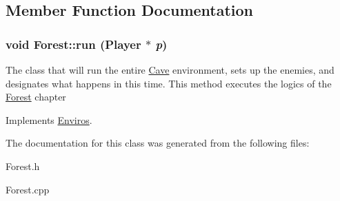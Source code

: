 \subsection{Member Function Documentation}
\hypertarget{classForest_a22996cfd5e18402e640316b7a6fb5feb}{
\subsubsection[{run}]{\setlength{\rightskip}{0pt plus 5cm}void Forest::run ({\bf Player} $\ast$ {\em p})}}
\label{classForest_a22996cfd5e18402e640316b7a6fb5feb}


The class that will run the entire \hyperlink{classCave}{Cave} environment, sets up the enemies, and designates what happens in this time. This method executes the logics of the \hyperlink{classForest}{Forest} chapter 

Implements \hyperlink{classEnviros}{Enviros}.

The documentation for this class was generated from the following files:\begin{DoxyCompactItemize}
\item 
Forest.h\item 
Forest.cpp\end{DoxyCompactItemize}
